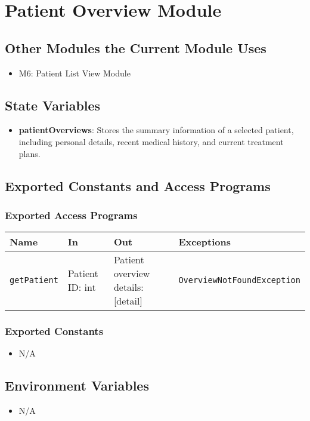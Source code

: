 \documentclass[12pt, titlepage]{article}
\begin{document}
\section{Patient Overview Module}

\subsection{Other Modules the Current Module Uses}
\begin{itemize}
  \item M6: Patient List View Module
\end{itemize}

\subsection{State Variables}
\begin{itemize}
\item \textbf{patientOverviews}: Stores the summary information of a selected patient, including personal details, recent medical history, and current treatment plans.
\end{itemize}

\subsection{Exported Constants and Access Programs}
\subsubsection{Exported Access Programs}
\begin{tabular}{|l|l|l|l|}
    \hline
    \textbf{Name} & \textbf{In} & \textbf{Out} & \textbf{Exceptions} \\
    \hline 
    \texttt{getPatient} & Patient ID: int & Patient overview details: [detail] & \texttt{OverviewNotFoundException} \\
    \hline
\end{tabular}

\subsubsection{Exported Constants}
\begin{itemize}
\item N/A
\end{itemize}

\subsection{Environment Variables}
\begin{itemize}
\item N/A
\end{itemize}
\end{document}
